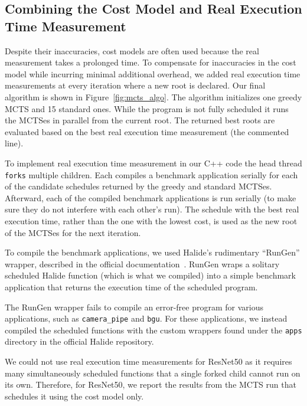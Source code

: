 \subsection{Combining the Cost Model and Real Execution Time Measurement}
Despite their inaccuracies, cost models are often used because the real measurement takes a prolonged time. To compensate for inaccuracies in the cost model while incurring minimal additional overhead, we added real execution time measurements at every iteration where a new root is declared. Our final algorithm is shown in Figure~\ref{fig:mcts_algo}. The algorithm initializes one greedy MCTS and 15 standard ones. While the program is not fully scheduled it runs the MCTSes in parallel from the current root. The returned best roots are evaluated based on the best real execution time measurement (the commented line).

To implement real execution time measurement in our C++ code the head thread \texttt{forks} multiple children. Each compiles a benchmark application serially for each of the candidate schedules returned by the greedy and standard MCTSes. Afterward, each of the compiled benchmark applications is run serially (to make sure they do not interfere with each other's run). The schedule with the best real execution time, rather than the one with the lowest cost, is used as the new root of the MCTSes for the next iteration.

To compile the benchmark applications, we used Halide's rudimentary ``RunGen'' wrapper, described in the official documentation~\cite{halide_rungen}. RunGen wraps a solitary scheduled Halide function (which is what we compiled) into a simple benchmark application that returns the execution time of the scheduled program. 

The RunGen wrapper fails to compile an error-free program for various applications, such as \texttt{camera\_pipe} and \texttt{bgu}. For these applications, we instead compiled the scheduled functions with the custom wrappers found under the \texttt{apps} directory in the official Halide repository. 

We could not use real execution time measurements for ResNet50 as it requires many simultaneously scheduled functions that a single forked child cannot run on its own. Therefore, for ResNet50, we report the results from the MCTS run that schedules it using the cost model only.

